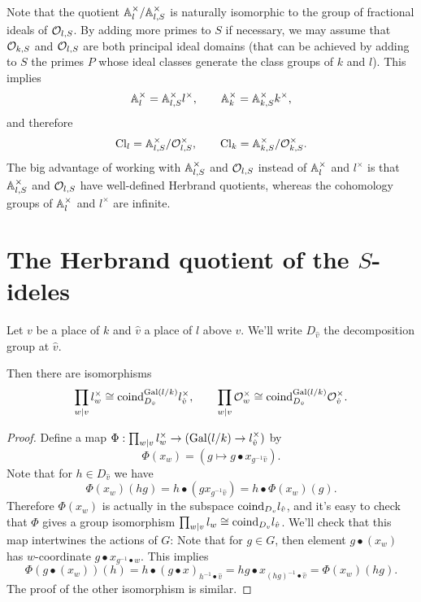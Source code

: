Note that the quotient ${\mathbb A}_l^\times / {\mathbb A}_{l,S}^\times$ is naturally isomorphic to the
group of fractional ideals of ${\mathcal O}_{l,S}$.
By adding more primes to $S$ if necessary, we may assume that ${\mathcal O}_{k,S}$ and ${\mathcal O}_{l,S}$ are both
principal ideal domains (that can be achieved by adding to $S$ the primes $P$ whose ideal classes
generate the class groups of $k$ and $l$).
This implies
\[
	{\mathbb A}_{l}^\times = {\mathbb A}_{l,S}^\times l^\times,
	\qquad
	{\mathbb A}_k^\times = {\mathbb A}_{k,S}^\times k^\times,
\]
and therefore
\[
	\mathrm{Cl}_{l} = {\mathbb A}_{l,S}^\times / {\mathcal O}_{l,S}^\times, \qquad
	\mathrm{Cl}_{k} = {\mathbb A}_{k,S}^\times / {\mathcal O}_{k,S}^\times.
\]
The big advantage of working with ${\mathbb A}_{l,S}^\times$ and ${\mathcal O}_{l,S}$ instead of ${\mathbb A}_l^\times$ and
$l^\times$ is that ${\mathbb A}_{l,S}^\times$ and ${\mathcal O}_{l,S}$ have well-defined Herbrand quotients,
whereas the cohomology groups of ${\mathbb A}_l^\times$ and $l^\times$ are infinite.





\section{The Herbrand quotient of the $S$-ideles}

Let $v$ be a place of $k$ and $\hat v$ a place of $l$ above $v$.
We'll write $D_{\hat v}$ the decomposition group at $\hat v$.

\begin{lemma}
	Then there are isomorphisms
	\[
		\prod_{w | v} l_w^\times
		\cong
		\mathrm{coind}_{D_{\hat v}}^{\mathrm{Gal}(l/k)} l_{\hat v}^\times,
		\qquad
		\prod_{w | v} {\mathcal O}_w^\times
		\cong
		\mathrm{coind}_{D_{\hat v}}^{\mathrm{Gal}(l/k)} {\mathcal O}_{\hat v}^\times.
	\]
\end{lemma}

\begin{proof}
	Define a map $\Phi : \prod_{w | v} l_w^\times \to (\mathrm{Gal}(l/k) \to l_{\hat v}^\times)$ by
	\[
		\Phi ( x_w)
		=
		(g \mapsto g \bullet x_{g^{-1} \hat v}).
	\]
	Note that for $h \in D_{\hat v}$ we have
	\[
		\Phi (x_w) (hg) = h \bullet (g  x_{g^{-1} \hat v}) = h \bullet \Phi(x_w) (g).
	\]
	Therefore $\Phi(x_w)$ is actually in the subspace $\mathrm{coind}_{D_v} l_{\hat v}$, and it's
	easy to check that $\Phi$ gives a group isomorphism
	$\prod_{w | v} l_w \cong \mathrm{coind}_{D_v} l_{\hat v}$.
	We'll check that this map intertwines the actions of $G$:
	Note that for $g \in G$, then element $g \bullet (x_w)$ has $w$-coordinate
	$g \bullet x_{g^{-1}\bullet w}$.
	This implies
	\[
		\Phi( g \bullet (x_w))(h)
		=	h\bullet (g \bullet x)_{h^{-1} \bullet \hat v}
		=	h g \bullet x_{(hg)^{-1} \bullet \hat v}
		= \Phi (x_w) (hg).
	\]
	The proof of the other isomorphism is similar.
\end{proof}

